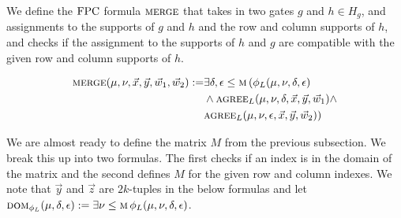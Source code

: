 \documentclass[../paper.tex]{subfiles}
\begin{document}
				
We define the $\text{\upshape FPC}$ formula $\textsc{merge}$ that takes in two gates $g$ and $h \in
H_g$, and assignments to the supports of $g$ and $h$ and the row and
column supports of $h$, and checks if the assignment to the supports of $h$ and
$g$ are compatible with the given row and column supports of $h$.
				
				
\begin{align*}
	\textsc{merge} (\mu, \nu, \vec{x}, \vec{y}, \vec{w}_1, \vec{w}_2) := & \exists \delta, \epsilon \leq \textsc{m} \, ( \phi_L (\mu, \nu, \delta, \epsilon) \\ & \land \textsc{agree}_L (\mu, \nu , \delta, \vec{x}, \vec{y}, \vec{w}_1) \land \\ & \textsc{agree}_L (\mu, \nu , \epsilon, \vec{x}, \vec{y}, \vec{w}_2))
\end{align*}
				
We are almost ready to define the matrix $M$ from the previous subsection. We
break this up into two formulas. The first checks if an index is in the domain
of the matrix and the second defines $M$ for the given row and column indexes.
We note that $\vec{y}$ and $\vec{z}$ are $2k$-tuples in the below formulas and
let $\textsc{dom}_{\phi_L} (\mu, \delta, \epsilon) := \exists \nu \leq \textsc{m} \,
\phi_L (\mu, \nu, \delta, \epsilon)$.
				
\end{document}
